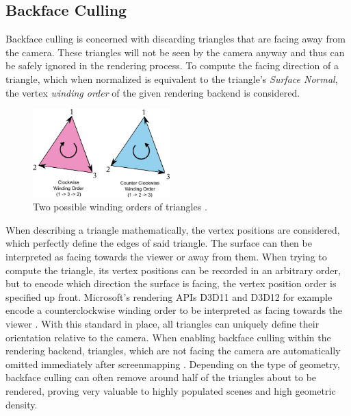 \subsection*{Backface Culling} \label{subsec-backface-culling}

Backface culling is concerned with discarding triangles that are facing away from the camera. 
These triangles will not be seen by the camera anyway and thus can be safely ignored in the rendering process. 
To compute the facing direction of a triangle, which when normalized is equivalent to the triangle's 
\emph{Surface Normal}, the vertex \emph{winding order} of the given rendering backend is considered.

\begin{figure}[h]
    \centering
    \includegraphics[width=200px]{images/graphics/winding-order-triangle.jpg}
    \caption{Two possible winding orders of triangles \cite{Michel2016}.}
    \label{fig:triangle-winding-order}
\end{figure}

\noindent
When describing a triangle mathematically, the vertex positions are considered, which perfectly define the edges of 
said triangle. The surface can then be interpreted as facing towards the viewer or away from them. 
When trying to compute the triangle, its vertex positions can be recorded in an arbitrary order, but to encode which 
direction the surface is facing, the vertex position order is specified up front. Microsoft's rendering \ac{API}s D3D11 
and D3D12 for example encode a counterclockwise winding order to be interpreted as facing towards the viewer 
\cite{D3DTopology2020}. With this standard in place, all triangles can uniquely define their orientation relative to 
the camera. When enabling backface culling within the rendering backend, triangles, which are not facing the camera 
are automatically omitted immediately after screenmapping \cite{AkenineMoeller2018}. Depending on the type of geometry, 
backface culling can often remove around half of the triangles about to be rendered, proving very valuable to highly 
populated scenes and high geometric density.

